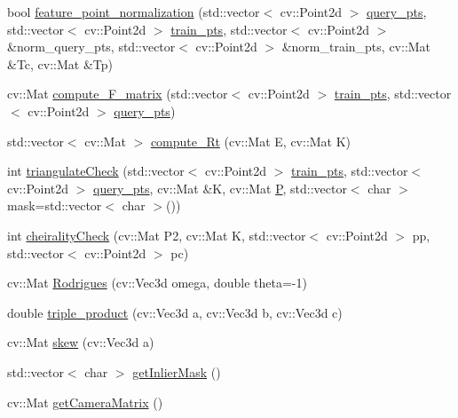 \begin{DoxyCompactItemize}
bool \hyperlink{classLRM_1_1MotionProcessor_aa5cf91a28041e8897469a9ba9bd4b35b}{feature\-\_\-point\-\_\-normalization} (std\-::vector$<$ cv\-::\-Point2d $>$ \hyperlink{classLRM_1_1MotionProcessor_af0e2f9ee5479177b49a6caf44962faff}{query\-\_\-pts}, std\-::vector$<$ cv\-::\-Point2d $>$ \hyperlink{classLRM_1_1MotionProcessor_ae72b3aea2c352caefb7f256a40ca6e31}{train\-\_\-pts}, std\-::vector$<$ cv\-::\-Point2d $>$ \&norm\-\_\-query\-\_\-pts, std\-::vector$<$ cv\-::\-Point2d $>$ \&norm\-\_\-train\-\_\-pts, cv\-::\-Mat \&\-Tc, cv\-::\-Mat \&\-Tp)
\item 
cv\-::\-Mat \hyperlink{classLRM_1_1MotionProcessor_aa06b8d787d57f51f99a0281582a136bc}{compute\-\_\-\-F\-\_\-matrix} (std\-::vector$<$ cv\-::\-Point2d $>$ \hyperlink{classLRM_1_1MotionProcessor_ae72b3aea2c352caefb7f256a40ca6e31}{train\-\_\-pts}, std\-::vector$<$ cv\-::\-Point2d $>$ \hyperlink{classLRM_1_1MotionProcessor_af0e2f9ee5479177b49a6caf44962faff}{query\-\_\-pts})
\item 
std\-::vector$<$ cv\-::\-Mat $>$ \hyperlink{classLRM_1_1MotionProcessor_af5cedadc3cafc249f88012884909b138}{compute\-\_\-\-Rt} (cv\-::\-Mat \-E, cv\-::\-Mat \-K)
\item 
int \hyperlink{classLRM_1_1MotionProcessor_a14ef29f158bf0fe19d05dbadc81e64a0}{triangulate\-Check} (std\-::vector$<$ cv\-::\-Point2d $>$ \hyperlink{classLRM_1_1MotionProcessor_ae72b3aea2c352caefb7f256a40ca6e31}{train\-\_\-pts}, std\-::vector$<$ cv\-::\-Point2d $>$ \hyperlink{classLRM_1_1MotionProcessor_af0e2f9ee5479177b49a6caf44962faff}{query\-\_\-pts}, cv\-::\-Mat \&\-K, cv\-::\-Mat \hyperlink{classLRM_1_1MotionProcessor_a84d9c7cce3207b43bb79988c32d07f23}{\-P}, std\-::vector$<$ char $>$ mask=std\-::vector$<$ char $>$())
\item 
int \hyperlink{classLRM_1_1MotionProcessor_a6d556c3dd5d0c682c407e65b51e2207e}{cheirality\-Check} (cv\-::\-Mat \-P2, cv\-::\-Mat \-K, std\-::vector$<$ cv\-::\-Point2d $>$ pp, std\-::vector$<$ cv\-::\-Point2d $>$ pc)
\item 
cv\-::\-Mat \hyperlink{classLRM_1_1MotionProcessor_a848e86c9fc94cf58de7c4f6ae7e50267}{\-Rodrigues} (cv\-::\-Vec3d omega, double theta=-\/1)
\item 
double \hyperlink{classLRM_1_1MotionProcessor_ac0000e0136ca3c117f1fc548b72d9912}{triple\-\_\-product} (cv\-::\-Vec3d a, cv\-::\-Vec3d b, cv\-::\-Vec3d c)
\item 
cv\-::\-Mat \hyperlink{classLRM_1_1MotionProcessor_a3254a463388e2a6db96e81aa29f5b72e}{skew} (cv\-::\-Vec3d a)
\item 
std\-::vector$<$ char $>$ \hyperlink{classLRM_1_1MotionProcessor_afea20e7bd776f189fabdd259c22e6b4e}{get\-Inlier\-Mask} ()
\item 
cv\-::\-Mat \hyperlink{classLRM_1_1MotionProcessor_a8029258b4e6d79233b7340eb7695b4f0}{get\-Camera\-Matrix} ()
\end{DoxyCompactItemize}
